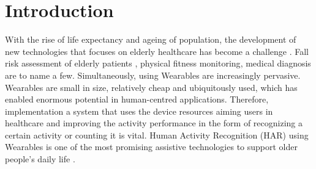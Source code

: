 \documentclass[journal,article,submit,moreauthors,pdftex]{Definitions/mdpi}
\begin{document}


\section{Introduction}

With the rise of life expectancy and ageing of population, the development of new technologies that focuses on elderly healthcare has become a challenge \cite{hong2008activity}. Fall risk assessment of elderly patients \cite{sow2013mining}, physical fitness monitoring\cite{morris2014recofit}, medical diagnosis \cite{gonzalez2015features} are to name a few. Simultaneously, using Wearables are increasingly pervasive. Wearables are small in size, relatively cheap and ubiquitously used, which has enabled enormous potential in human-centred applications. Therefore, implementation a system that uses the device resources aiming users in healthcare and improving the activity performance in the form of recognizing a certain activity or counting it \cite{schilit1994context} is vital. Human Activity Recognition (HAR) using Wearables is one of the most promising assistive technologies to support older people's daily life \cite{wang2019survey}.\\
\end{document}
